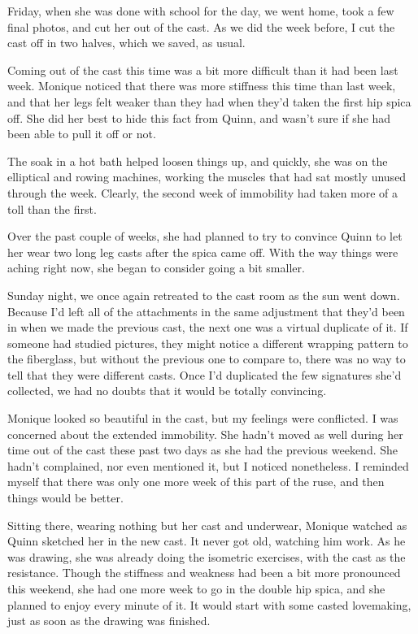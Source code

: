 Friday, when she was done with school for the day, we went home, took a few final photos,
and cut her out of the cast. As we did the week before, I cut the cast off in two halves, which
we saved, as usual.

\begin{thought}
Coming out of the cast this time was a bit more difficult than it had been last week.
Monique noticed that there was more stiffness this time than last week, and that her legs felt
weaker than they had when they'd taken the first hip spica off. She did her best to hide this
fact from Quinn, and wasn't sure if she had been able to pull it off or not.

The soak in a hot bath helped loosen things up, and quickly, she was on the elliptical and
rowing machines, working the muscles that had sat mostly unused through the week. Clearly, the
second week of immobility had taken more of a toll than the first.

Over the past couple of weeks, she had planned to try to convince Quinn to let her wear two
long leg casts after the spica came off. With the way things were aching right now, she began to
consider going a bit smaller.
\end{thought}

Sunday night, we once again retreated to the cast room as the sun went down. Because I'd
left all of the attachments in the same adjustment that they'd been in when we made the previous
cast, the next one was a virtual duplicate of it. If someone had studied pictures, they might
notice a different wrapping pattern to the fiberglass, but without the previous one to compare
to, there was no way to tell that they were different casts. Once I'd duplicated the few
signatures she'd collected, we had no doubts that it would be totally convincing.

Monique looked so beautiful in the cast, but my feelings were conflicted. I was concerned
about the extended immobility. She hadn't moved as well during her time out of the cast these
past two days as she had the previous weekend. She hadn't complained, nor even mentioned it, but
I noticed nonetheless. I reminded myself that there was only one more week of this part of the
ruse, and then things would be better.

\begin{thought}
Sitting there, wearing nothing but her cast and underwear, Monique watched as Quinn
sketched her in the new cast. It never got old, watching him work. As he was drawing, she was
already doing the isometric exercises, with the cast as the resistance. Though the stiffness and
weakness had been a bit more pronounced this weekend, she had one more week to go in the double
hip spica, and she planned to enjoy every minute of it. It would start with some casted
lovemaking, just as soon as the drawing was finished.
\end{thought}

